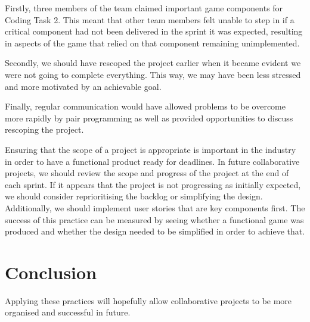 \documentclass{scrartcl}
\begin{document}
Firstly, three members of the team claimed important game components for Coding Task 2. This meant that other team members felt unable to step in if a critical component had not been delivered in the sprint it was expected, resulting in aspects of the game that relied on that component remaining unimplemented. 

Secondly, we should have rescoped the project earlier when it became evident we were not going to complete everything. This way, we may have been less stressed and more motivated by an achievable goal.

Finally, regular communication would have allowed problems to be overcome more rapidly by pair programming as well as provided opportunities to discuss rescoping the project.

Ensuring that the scope of a project is appropriate is important in the industry in order to have a functional product ready for deadlines.
In future collaborative projects, we should review the scope and progress of the project at the end of each sprint. If it appears that the project is not progressing as initially expected, we should consider reprioritising the backlog or simplifying the design. Additionally, we should implement user stories that are key components first. The success of this practice can be measured by seeing whether a functional game was produced and whether the design needed to be simplified in order to achieve that.


\section{Conclusion}
Applying these practices will hopefully allow collaborative projects to be more organised and successful in future. 


\end{document}
